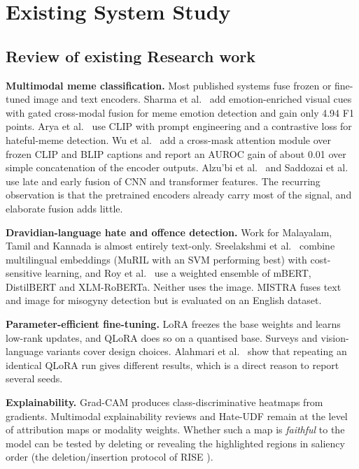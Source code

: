 \label{chap.2}

\section{Existing System Study}
\subsection{Review of existing Research work}

\textbf{Multimodal meme classification.} Most published systems fuse frozen or fine-tuned image and text encoders. Sharma et al.\ \cite{sharma2024emotion} add emotion-enriched visual cues with gated cross-modal fusion for meme emotion detection and gain only 4.94 F1 points. Arya et al.\ \cite{arya2024clip} use CLIP with prompt engineering and a contrastive loss for hateful-meme detection. Wu et al.\ \cite{wu2024tcam} add a cross-mask attention module over frozen CLIP and BLIP captions and report an AUROC gain of about 0.01 over simple concatenation of the encoder outputs. Alzu'bi et al.\ \cite{alzubi2023offensive} and Saddozai et al.\ \cite{saddozai2025mmhs} use late and early fusion of CNN and transformer features. The recurring observation is that the pretrained encoders already carry most of the signal, and elaborate fusion adds little.

\textbf{Dravidian-language hate and offence detection.} Work for Malayalam, Tamil and Kannada is almost entirely text-only. Sreelakshmi et al.\ \cite{sreelakshmi2024hasoc} combine multilingual embeddings (MuRIL with an SVM performing best) with cost-sensitive learning, and Roy et al.\ \cite{roy2022ensemble} use a weighted ensemble of mBERT, DistilBERT and XLM-RoBERTa. Neither uses the image. MISTRA \cite{jindal2024mistra} fuses text and image for misogyny detection but is evaluated on an English dataset.

\textbf{Parameter-efficient fine-tuning.} LoRA \cite{hu2022lora} freezes the base weights and learns low-rank updates, and QLoRA \cite{dettmers2023qlora} does so on a quantised base. Surveys \cite{mao2025lora} and vision-language variants \cite{duan2025mobius} cover design choices. Alahmari et al.\ \cite{alahmari2024repeat} show that repeating an identical QLoRA run gives different results, which is a direct reason to report several seeds.

\textbf{Explainability.} Grad-CAM \cite{selvaraju2020gradcam} produces class-discriminative heatmaps from gradients. Multimodal explainability reviews \cite{rodis2024mxai} and Hate-UDF \cite{lei2025hateudf} remain at the level of attribution maps or modality weights. Whether such a map is \emph{faithful} to the model can be tested by deleting or revealing the highlighted regions in saliency order (the deletion/insertion protocol of RISE \cite{petsiuk2018rise}).

